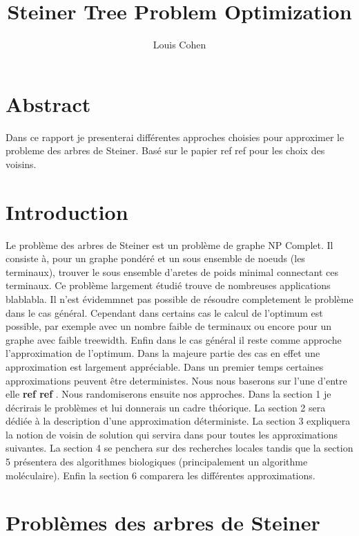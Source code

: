 \documentclass[10pt,a4paper]{article}
\author{Louis Cohen}
\title{Steiner Tree Problem Optimization}
\begin{document}
\maketitle	

\tableofcontents

\section{Abstract}

Dans ce rapport je presenterai différentes approches choisies pour approximer le probleme des arbres de Steiner. Basé sur le papier ref ref pour les choix des voisins. 

\section{Introduction}

Le problème des arbres de Steiner est un problème de graphe NP Complet. Il consiste à, pour un graphe pondéré et un sous ensemble de noeuds (les terminaux), trouver le sous ensemble d'aretes de poids minimal connectant ces terminaux. Ce problème largement étudié trouve de nombreuses applications blablabla. Il n'est évidemmnet pas possible de résoudre completement le problème dans le cas général. Cependant dans certains cas le calcul de l'optimum est possible, par exemple avec un nombre faible de terminaux ou encore pour un graphe avec faible treewidth. Enfin dans le cas général il reste comme approche l'approximation de l'optimum. Dans la majeure partie des cas en effet une approximation est largement appréciable. Dans un premier temps certaines approximations peuvent être deterministes.  Nous nous baserons sur l'une d'entre elle \textbf{ref ref }. Nous randomiserons ensuite nos approches. Dans la section 1 je décrirais le problèmes et lui donnerais un cadre théorique. La section 2 sera dédiée à la description d'une approximation déterministe. La section 3 expliquera la notion de voisin de solution qui servira dans pour toutes les approximations suivantes. La section 4 se penchera sur des recherches locales tandis que la section 5 présentera des algorithmes biologiques (principalement un algorithme moléculaire). Enfin la section 6 comparera les différentes approximations.


\section{Problèmes des arbres de Steiner}
\end{document}
